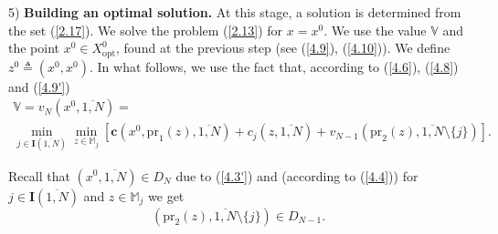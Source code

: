 \documentclass[numbers,sort&compress]{IntechOpen-Book}%
\begin{document}
5) {\bf Building an optimal solution.}
At this stage, a solution is determined from the set (\ref{2.17}).
We solve the problem
 (\ref{2.13})
for
$x=x^0$.
We use the value
$\mathbb{V}$
and the point
$x^0 \in X^0_{\mathrm{opt}}$,
found at the previous step
(see (\ref{4.9}), (\ref{4.10})).
We define $z^0 {\triangleq} (x^0,x^0)$.
In what follows, we use the fact that, according to
 (\ref{4.6}), (\ref{4.8}) and (\ref{4.9'})
\begin{multline}
  \label{4.11}
  \mathbb{V} = v_N(x^0,\overline{1,N}) = \\
  \min\limits_{j \in \mathbf{I}(\overline{1,N})}
  \min\limits_{z \in \mathbb{M}_j}
  [\mathbf{c}(x^0,\mathrm{pr}_1(z),\overline{1,N}) + c_j(z,\overline{1,N}) + v_{N-1}(\mathrm{pr}_2(z),\overline{1,N} \setminus \{j\})].
\end{multline}

Recall that
$(x^0,\overline{1,N}) \in D_N$
due to (\ref{4.3'})
and
(according to (\ref{4.4}))
for
$j \in \mathbf{I}(\overline{1,N})$
and
$z \in \mathbb{M}_j$
we get
$$
  (\mathrm{pr}_2(z),\overline{1,N} \setminus \{j\}) \in D_{N-1}
  .
$$
\end{document}
